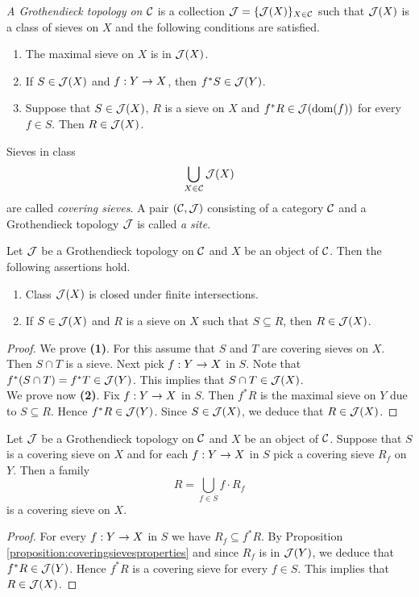 \begin{definition}
\textit{A Grothendieck topology on ${\mathcal C}$} is a collection ${\mathcal J}=\{{\mathcal J}(X)\}_{X\in {\mathcal C}}$ such that ${\mathcal J}(X)$ is a class of sieves on $X$ and the following conditions are satisfied. 
\begin{enumerate}[label=\textbf{(\arabic*)}, leftmargin=1.5em]
\item The maximal sieve on $X$ is in ${\mathcal J}(X)$.
\item If $S\in {\mathcal J}(X)$ and $f:Y\rightarrow X$, then $f^*S\in {\mathcal J}(Y)$.
\item Suppose that $S\in {\mathcal J}(X)$, $R$ is a sieve on $X$ and $f^*R\in {\mathcal J}(\mathrm{dom}(f))$ for every $f\in S$. Then $R\in {\mathcal J}(X)$.
\end{enumerate}
Sieves in class
$$\bigcup_{X\in {\mathcal C}}{\mathcal J}(X)$$
are called \textit{covering sieves}. A pair $({\mathcal C},{\mathcal J})$ consisting of a category ${\mathcal C}$ and a Grothendieck topology ${\mathcal J}$ is called \textit{a site}.
\end{definition}

\begin{proposition}\label{proposition:coveringsievesproperties}
Let ${\mathcal J}$ be a Grothendieck topology on ${\mathcal C}$ and $X$ be an object of ${\mathcal C}$. Then the following assertions hold.
\begin{enumerate}[label=\emph{\textbf{(\arabic*)}}, leftmargin=1.5em]
\item Class ${\mathcal J}(X)$ is closed under finite intersections.
\item If $S\in {\mathcal J}(X)$ and $R$ is a sieve on $X$ such that $S\subseteq R$, then $R\in {\mathcal J}(X)$.
\end{enumerate}
\end{proposition}
\begin{proof}
We prove \textbf{(1)}. For this assume that $S$ and $T$ are covering sieves on $X$. Then $S\cap T$ is a sieve. Next pick $f:Y\rightarrow X$ in $S$. Note that $f^*(S\cap T)=f^*T\in {\mathcal J}(Y)$. This implies that $S\cap T\in {\mathcal J}(X)$.\\
We prove now \textbf{(2)}. Fix $f:Y\rightarrow X$ in $S$. Then $f^*R$ is the maximal sieve on $Y$ due to $S\subseteq R$. Hence $f^*R\in {\mathcal J}(Y)$. Since $S\in {\mathcal J}(X)$, we deduce that $R\in {\mathcal J}(X)$.
\end{proof}

\begin{fact}\label{fact:compositionofcoveringsieves}
Let ${\mathcal J}$ be a Grothendieck topology on ${\mathcal C}$ and $X$ be an object of ${\mathcal C}$. Suppose that $S$ is a covering sieve on $X$ and for each $f:Y\rightarrow X$ in $S$ pick a covering sieve $R_f$ on $Y$. Then a family
$$R=\bigcup_{f\in S}f\cdot R_f$$ 
is a covering sieve on $X$.
\end{fact}
\begin{proof}
For every $f:Y\rightarrow X$ in $S$ we have $R_f\subseteq f^*R$. By Proposition \ref{proposition:coveringsievesproperties} and since $R_f$ is in ${\mathcal J}(Y)$, we deduce that $f^*R\in {\mathcal J}(Y)$. Hence $f^*R$ is a covering sieve for every $f\in S$. This implies that $R\in {\mathcal J}(X)$.
\end{proof}

